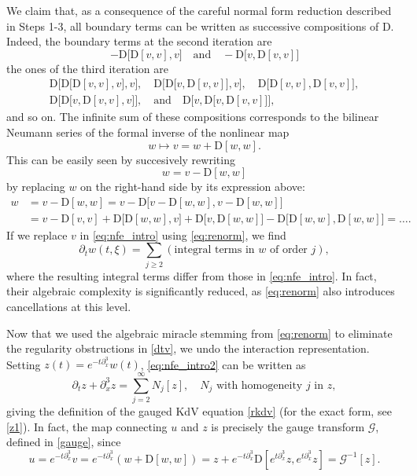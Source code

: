 \documentclass[a4paper,
11pt,  reqno]{amsart}
\newcommand{\5}{\textup{V}}
\newcommand{\dx}{\partial_x}
\newcommand{\dt}{\partial_t}
\theoremstyle{remark}
\newcommand{\Gc}{\mathcal{G}}
\numberwithin{equation}{section}
\numberwithin{theorem}{section}
\newcommand{\D}{\mathrm{D}}
\begin{document}
	We claim that, as a consequence of the careful normal form reduction described in Steps 1-3, all boundary terms can be written as successive compositions of $\D$. Indeed, the boundary terms at the second iteration are
	$$
	-\D\big[\D[v,v],v\big]
\quad
\text{and}
\quad
-\D\big[v,\D[v,v]\big]
	$$
	the ones of the third iteration are
\begin{gather}
\D\Big[\D\big[\D[v,v],v\big],v\Big],
\quad \D\Big[\D\big[v,\D[v,v]\big],v\Big],
\quad \D\big[\D[v,v],\D[v,v]\big],
\\
\D\Big[\D\big[v, \D[v,v],v\big]\Big],\quad
\text{and}
\quad  \D\Big[v,\D\big[v,\D[v,v]\big]\Big],
\end{gather}
	and so on. The infinite sum of these compositions corresponds to the bilinear Neumann series of the formal inverse of the nonlinear map
\begin{equation}\label{eq:renorm}
		w\mapsto v=w+\D[w,w].
	\end{equation}
    This can be easily seen by succesively rewriting
	$$
	w=v-\D[w,w]
	$$
by replacing $w$ on the right-hand side by its expression above:
	\begin{align}
		w
&=v-\D[w,w]=v-\D\big[v-\D[w,w],v-\D[w,w]\big]
\\
&=v-\D[v,v]+\D\big[\D[w,w],v\big]+\D\big[v,\D[w,w]\big]-\D\big[\D[w,w],\D[w,w]\big]=\dots.
	\end{align}
	If we replace $v$ in \eqref{eq:nfe_intro} using \eqref{eq:renorm}, we find
	\begin{equation}\label{eq:nfe_intro2}
		\dt \widehat{w}(t,\xi)= \sum_{j\ge 2} (\mbox{integral terms in }w\mbox{ of order }j),
	\end{equation}
where the resulting integral terms differ from those in \eqref{eq:nfe_intro}. In fact, their algebraic complexity is significantly reduced, as \eqref{eq:renorm} also introduces cancellations at this level.


    Now that {we used the algebraic miracle stemming from \eqref{eq:renorm} to} eliminate the regularity obstructions in \eqref{dtv}, we undo the interaction representation. Setting $z(t)=e^{-t\partial_x^3}w(t)$, \eqref{eq:nfe_intro2} can be written as
    \begin{equation}\label{eq:z_intro_2}
\dt z + \dx^3 z = \sum_{j= 2}^\infty N_j[z],\quad N_j\mbox{ with homogeneity }j \mbox{ in }z,
    \end{equation}
    giving the definition of the gauged KdV equation \eqref{rkdv} (for the exact form, see \eqref{z1}).
In fact,
    the map connecting  $u$ and $z$  is precisely the gauge transform $\Gc$, defined in \eqref{gauge}, since
    \begin{equation}
u=e^{-t\dx^3}v= e^{-t\dx^3}\left(w+\D[w,w]\right)= z + e^{-t\dx^3}\D[e^{t\dx^3}z, e^{t\dx^3}z] = \Gc^{-1}[z].
    \end{equation}
\end{document}
